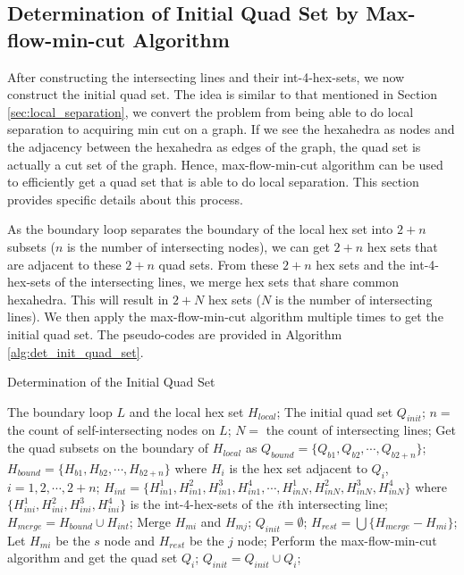 \documentclass[final,5p,times,twocolumn]{elsarticle}
\begin{document}
\subsection{Determination of Initial Quad Set by Max-flow-min-cut Algorithm}
\label{sec:det_init_quad_set}
After constructing the intersecting lines and their int-4-hex-sets, we now construct the initial quad set. The idea is similar to that mentioned in Section \ref{sec:local_separation}, we convert the problem from being able to do local separation to acquiring min cut on a graph. If we see the hexahedra as nodes and the adjacency between the hexahedra as edges of the graph, the quad set is actually a cut set of the graph. Hence, max-flow-min-cut algorithm can be used to efficiently get a quad set that is able to do local separation. This section provides specific details about this process.

As the boundary loop separates the boundary of the local hex set into $2+n$ subsets ($n$ is the number of intersecting nodes), we can get $2+n$ hex sets that are adjacent to these $2+n$ quad sets. From these $2+n$ hex sets and the int-4-hex-sets of the intersecting lines, we merge hex sets that share common hexahedra. This will result in $2+N$ hex sets ($N$ is the number of intersecting lines). We then apply the max-flow-min-cut algorithm multiple times to get the initial quad set. The pseudo-codes are provided in Algorithm \ref{alg:det_init_quad_set}.

\begin{algorithm}
\caption{Determination of the Initial Quad Set}
\label{alg:det_init_quad_set}
\begin{algorithmic}[1]
  \REQUIRE The boundary loop $L$ and the local hex set $H_{local}$;
  \ENSURE The initial quad set $Q_{init}$;
  \STATE $n=$ the count of self-intersecting nodes on $L$;
  \STATE $N=$ the count of intersecting lines;
  \STATE Get the quad subsets on the boundary of $H_{local}$ as $Q_{bound}=\{Q_{b1},Q_{b2},\cdots,Q_{b2+n}\}$;
  \STATE $H_{bound}=\{H_{b1},H_{b2},\cdots,H_{b2+n}\}$ where $H_i$ is the hex set adjacent to $Q_i$,$i=1,2,\cdots,2+n$;
  \STATE $H_{int}=\{H_{in1}^1,H_{in1}^2,H_{in1}^3,H_{in1}^4,\cdots,H_{inN}^1,H_{inN}^2,H_{inN}^3,H_{inN}^4\}$ where $\{H_{ini}^1,H_{ini}^2,H_{ini}^3,H_{ini}^4\}$ is the int-4-hex-sets of the $i$th intersecting line;
  \STATE $H_{merge}=H_{bound} \cup H_{int}$;
     \STATE Merge $H_{mi}$ and $H_{mj}$;
  \ENDWHILE
  \STATE $Q_{init}=\emptyset$;
     \STATE $H_{rest}=\bigcup \{H_{merge} - H_{mi}\}$;
     \STATE Let $H_{mi}$ be the $s$ node and $H_{rest}$ be the $j$ node;
     \STATE Perform the max-flow-min-cut algorithm and get the quad set $Q_i$;
     \STATE $Q_{init}=Q_{init} \cup Q_i$;
  \ENDFOR
\end{algorithmic}
\end{algorithm}
\end{document}
